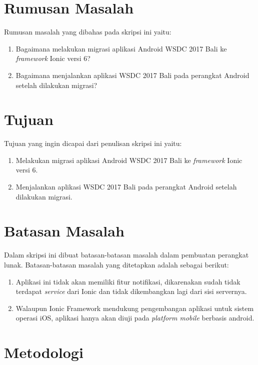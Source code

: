 \newpage

\section{Rumusan Masalah}
\label{sec:rumusan}
Rumusan masalah yang dibahas pada skripsi ini yaitu:
\begin{enumerate}
	\item Bagaimana melakukan migrasi aplikasi Android WSDC 2017 Bali ke {\it framework} Ionic versi 6?
	\item Bagaimana menjalankan aplikasi WSDC 2017 Bali pada perangkat Android setelah dilakukan migrasi?
\end{enumerate}


\section{Tujuan}
\label{sec:tujuan}
Tujuan yang ingin dicapai dari penulisan skripsi ini yaitu:
\begin{enumerate}
	\item Melakukan migrasi aplikasi Android WSDC 2017 Bali ke {\it framework} Ionic versi 6.
	\item Menjalankan aplikasi WSDC 2017 Bali pada perangkat Android setelah dilakukan migrasi.
\end{enumerate}


\section{Batasan Masalah}
\label{sec:batasan}
Dalam skripsi ini dibuat batasan-batasan masalah dalam pembuatan perangkat lunak.  Batasan-batasan masalah yang ditetapkan adalah sebagai berikut:

\begin{enumerate}
    \item Aplikasi ini tidak akan memiliki fitur notifikasi, dikarenakan sudah tidak terdapat \textit{service} dari Ionic dan tidak dikembangkan lagi dari sisi servernya. 
    
    \item Walaupun Ionic Framework mendukung pengembangan aplikasi untuk sistem operasi iOS, aplikasi hanya akan diuji pada \textit{platform mobile} berbasis android.
    
\end{enumerate}


\section{Metodologi}
\label{sec:metlit}


